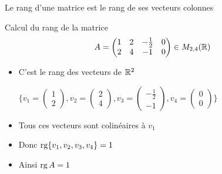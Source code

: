 \begin{frame}

\begin{mydefinition}
Le rang d'une matrice est le rang de ses vecteurs colonnes
\end{mydefinition}
\pause
\begin{exemple}
Calcul du rang de la matrice 
$$A = \begin{pmatrix}
  1 & 2 & -\frac12 & 0 \\
  2 & 4 & -1       & 0
  \end{pmatrix} \in M_{2,4}(\mathbb{R})$$
\pause  
\begin{itemize}
  \item C'est le rang des vecteurs de $\mathbb{R}^2$
\centerline{  
$\bigg\{ 
v_1 = \left(\begin{smallmatrix}1 \\ 2  \end{smallmatrix}\right),
v_2 = \left(\begin{smallmatrix}2 \\ 4  \end{smallmatrix}\right),
v_3 = \left(\begin{smallmatrix}-\frac 12 \\ -1  \end{smallmatrix}\right),
v_4 = \left(\begin{smallmatrix}0 \\ 0  \end{smallmatrix}\right)
\bigg\}$
}
\pause
  \item Tous ces vecteurs sont colinéaires à $v_1$
\pause
  \item Donc $\mathop{\text{rg}}\nolimits \{ v_1, v_2, v_3, v_4 \} = 1$
\pause 
  \item Ainsi $\mathop{\text{rg}}\nolimits A = 1$
\end{itemize}

\end{exemple}

\end{frame}


